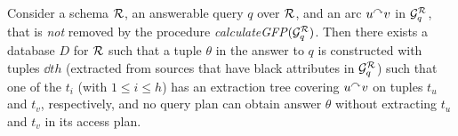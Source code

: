 \begin{lemma} \label{the:optim-completeness}
  Consider a schema $\mathcal{R}$, an answerable query $q$ over $\mathcal{R}$,
and an arc $u\mbox{$^{\curvearrowright}$} v$ in $\mathcal{G}_q^{\mathcal{R}}$, that is \emph{not} removed
  by the procedure \textit{calculateGFP}$(\mathcal{G}_q^{\mathcal{R}})$.  Then there exists a database $D$ for
  $\mathcal{R}$ such that a tuple $\theta$ in the answer to $q$ is constructed with tuples $\dd{t}{h}$
  (extracted from sources that have black attributes in $\mathcal{G}_q^{\mathcal{R}}$) such that one of the $t_i$ (with $1 \leq i \leq h$) has an extraction tree
  covering $u\mbox{$^{\curvearrowright}$} v$ on tuples $t_{u}$ and $t_{v}$, respectively,
  and no query plan can obtain answer $\theta$ without extracting $t_{u}$ and $t_{v}$ in its access plan.
%  
\end{lemma}

